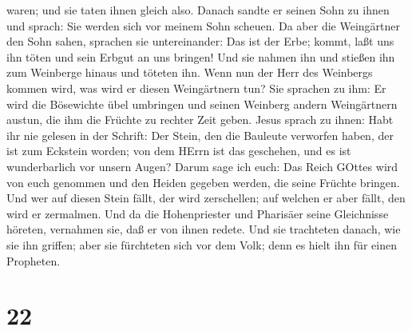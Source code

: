 waren; und sie taten ihnen gleich also.  Danach sandte er
seinen Sohn zu ihnen und sprach: Sie werden sich vor meinem Sohn
scheuen.  Da aber die Weingärtner den Sohn sahen, sprachen
sie untereinander: Das ist der Erbe; kommt, laßt uns ihn töten und sein
Erbgut an uns bringen!  Und sie nahmen ihn und stießen ihn
zum Weinberge hinaus und töteten ihn.  Wenn nun der Herr
des Weinbergs kommen wird, was wird er diesen Weingärtnern tun?
 Sie sprachen zu ihm: Er wird die Bösewichte übel umbringen
und seinen Weinberg andern Weingärtnern austun, die ihm die Früchte zu
rechter Zeit geben.  Jesus sprach zu ihnen: Habt ihr nie
gelesen in der Schrift: Der Stein, den die Bauleute verworfen haben, der
ist zum Eckstein worden; von dem HErrn ist das geschehen, und es ist
wunderbarlich vor unsern Augen?  Darum sage ich euch: Das
Reich GOttes wird von euch genommen und den Heiden gegeben werden, die
seine Früchte bringen.  Und wer auf diesen Stein fällt, der
wird zerschellen; auf welchen er aber fällt, den wird er zermalmen.
 Und da die Hohenpriester und Pharisäer seine Gleichnisse
höreten, vernahmen sie, daß er von ihnen redete.  Und sie
trachteten danach, wie sie ihn griffen; aber sie fürchteten sich vor dem
Volk; denn es hielt ihn für einen Propheten.

\hypertarget{section-21}{%
\section{22}\label{section-21}}


